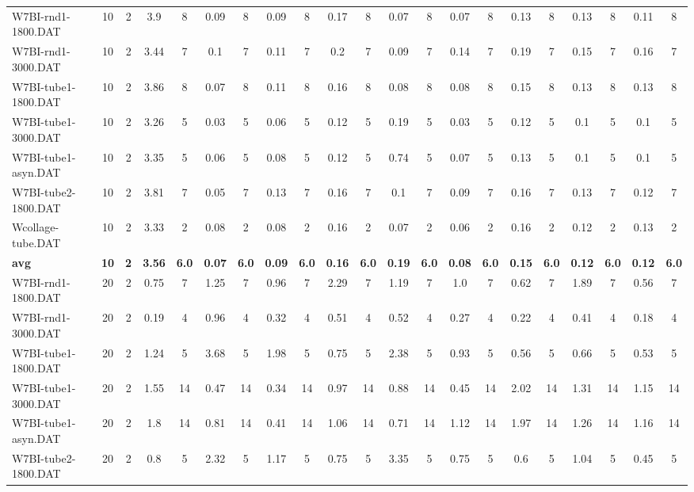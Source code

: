 \begin{sidewaystable}[!ht]
{\begin{tabular}{lcccccccccccccccccccc}
W7BI-rnd1-1800.DAT & 10 & 2 & 3.9 & 8 & 0.09 & 8 & 0.09 & 8 & 0.17 & 8 & 0.07 & 8 & 0.07 & 8 & 0.13 & 8 & 0.13 & 8 & 0.11 & 8 \\
W7BI-rnd1-3000.DAT & 10 & 2 & 3.44 & 7 & 0.1 & 7 & 0.11 & 7 & 0.2 & 7 & 0.09 & 7 & 0.14 & 7 & 0.19 & 7 & 0.15 & 7 & 0.16 & 7 \\
W7BI-tube1-1800.DAT & 10 & 2 & 3.86 & 8 & 0.07 & 8 & 0.11 & 8 & 0.16 & 8 & 0.08 & 8 & 0.08 & 8 & 0.15 & 8 & 0.13 & 8 & 0.13 & 8 \\
W7BI-tube1-3000.DAT & 10 & 2 & 3.26 & 5 & 0.03 & 5 & 0.06 & 5 & 0.12 & 5 & 0.19 & 5 & 0.03 & 5 & 0.12 & 5 & 0.1 & 5 & 0.1 & 5 \\
W7BI-tube1-asyn.DAT & 10 & 2 & 3.35 & 5 & 0.06 & 5 & 0.08 & 5 & 0.12 & 5 & 0.74 & 5 & 0.07 & 5 & 0.13 & 5 & 0.1 & 5 & 0.1 & 5 \\
W7BI-tube2-1800.DAT & 10 & 2 & 3.81 & 7 & 0.05 & 7 & 0.13 & 7 & 0.16 & 7 & 0.1 & 7 & 0.09 & 7 & 0.16 & 7 & 0.13 & 7 & 0.12 & 7 \\
Wcollage-tube.DAT & 10 & 2 & 3.33 & 2 & 0.08 & 2 & 0.08 & 2 & 0.16 & 2 & 0.07 & 2 & 0.06 & 2 & 0.16 & 2 & 0.12 & 2 & 0.13 & 2 \\
\cline{1-21} \textbf{avg} & \textbf{10} & \textbf{2} & \textbf{3.56} & \textbf{6.0} & \textbf{0.07} & \textbf{6.0} & \textbf{0.09} & \textbf{6.0} & \textbf{0.16} & \textbf{6.0} & \textbf{0.19} & \textbf{6.0} & \textbf{0.08} & \textbf{6.0} & \textbf{0.15} & \textbf{6.0} & \textbf{0.12} & \textbf{6.0} & \textbf{0.12} & \textbf{6.0} \\ \cline{1-21}
W7BI-rnd1-1800.DAT & 20 & 2 & 0.75 & 7 & 1.25 & 7 & 0.96 & 7 & 2.29 & 7 & 1.19 & 7 & 1.0 & 7 & 0.62 & 7 & 1.89 & 7 & 0.56 & 7 \\
W7BI-rnd1-3000.DAT & 20 & 2 & 0.19 & 4 & 0.96 & 4 & 0.32 & 4 & 0.51 & 4 & 0.52 & 4 & 0.27 & 4 & 0.22 & 4 & 0.41 & 4 & 0.18 & 4 \\
W7BI-tube1-1800.DAT & 20 & 2 & 1.24 & 5 & 3.68 & 5 & 1.98 & 5 & 0.75 & 5 & 2.38 & 5 & 0.93 & 5 & 0.56 & 5 & 0.66 & 5 & 0.53 & 5 \\
W7BI-tube1-3000.DAT & 20 & 2 & 1.55 & 14 & 0.47 & 14 & 0.34 & 14 & 0.97 & 14 & 0.88 & 14 & 0.45 & 14 & 2.02 & 14 & 1.31 & 14 & 1.15 & 14 \\
W7BI-tube1-asyn.DAT & 20 & 2 & 1.8 & 14 & 0.81 & 14 & 0.41 & 14 & 1.06 & 14 & 0.71 & 14 & 1.12 & 14 & 1.97 & 14 & 1.26 & 14 & 1.16 & 14 \\
W7BI-tube2-1800.DAT & 20 & 2 & 0.8 & 5 & 2.32 & 5 & 1.17 & 5 & 0.75 & 5 & 3.35 & 5 & 0.75 & 5 & 0.6 & 5 & 1.04 & 5 & 0.45 & 5 \\

\end{tabular}}
\end{sidewaystable}
